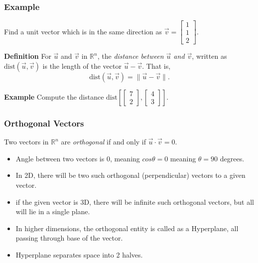 \begin{frame}[fragile] \frametitle{Example}
 Find a unit vector which is in the same direction as $\vec{v} =
\left[ \begin{array}{rrrr} 1 \\ 1 \\ 2 \end{array} \right]$.
 

\textbf{Definition}
For $\vec{u}$ and $\vec{v}$ in $\mathbb R^n$, the {\em distance between $\vec{u}$
and $\vec{v}$}, written as $\text{dist}(\vec{u},\vec{v})$ is the length
of the vector $\vec{u}-\vec{v}$.  That is,
\[
 \text{dist}(\vec{u},\vec{v})  = \| \vec{u} - \vec{v} \|.
\]
  

\textbf{Example}
 Compute the distance 
$\text{dist}\left[\left[ \begin{array}{rrrr}7 \\ 2 \end{array} \right],\left[ \begin{array}{rrrr} 4 \\ 3 \end{array} \right]\right]$.

\end{frame}

\begin{frame}[fragile] \frametitle{Orthogonal Vectors}
 Two vectors in $\mathbb R^n$ are {\em orthogonal} if and only if $\vec{u}\cdot\vec{v}=0$.

\begin{itemize}
\item Angle between two vectors is 0, meaning $cos\theta = 0$ meaning $\theta = 90$ degrees.
\item In 2D, there will be two such orthogonal (perpendicular) vectors to a given vector.
\item if the given vector is 3D, there will be infinite such orthogonal vectors, but all will lie in a single plane.
\item In higher dimensions, the orthogonal entity is called as a Hyperplane, all passing through base of the vector.
\item Hyperplane separates space into 2  halves.
\end{itemize}

\end{frame}

